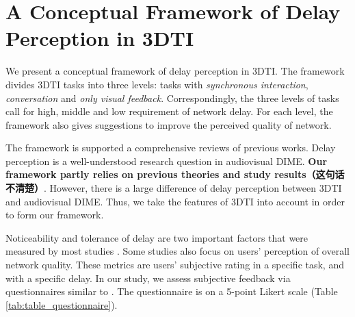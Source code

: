 \section{A Conceptual Framework of Delay Perception in 3DTI}



We present a conceptual framework of delay perception in 3DTI. The framework divides 3DTI tasks into three levels: tasks with \emph{synchronous interaction}, \emph{conversation} and \emph{only visual feedback}. Correspondingly, the three levels of tasks call for high, middle and low requirement of network delay. For each level, the framework also gives suggestions to improve the perceived quality of network.

The framework is supported a comprehensive reviews of previous works. Delay perception is a well-understood research question in audiovisual DIME. \textbf{Our framework partly relies on previous theories and study results（这句话不清楚）}. However, there is a large difference of delay perception between 3DTI and audiovisual DIME. Thus, we take the features of 3DTI into account in order to form our framework.

Noticeability and tolerance of delay are two important factors that were measured by most studies \cite{wu2009quality, schmitt2014influence, geerts2011we, schmitt2014asymmetric}. Some studies also focus on users' perception of overall network quality. These metrics are users' subjective rating in a specific task, and with a specific delay. In our study, we assess subjective feedback via questionnaires similar to \cite{schmitt2014influence}. The questionnaire is on a 5-point Likert scale (Table \ref{tab:table_questionnaire}).

